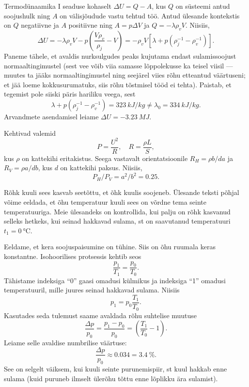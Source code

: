 \documentclass[10pt]{article}
\begin{document}
{%

\solu
Termodünaamika I seaduse kohaselt $\Delta U = Q - A$, kus $Q$ on süsteemi antud soojushulk ning $A$ on välisjõudude vastu tehtud töö. Antud ülesande kontekstis on $Q$ negatiivne ja $A$ positiivne ning $A = p\Delta V$ ja $Q = -\lambda \rho_vV$. Niisiis,
\[
\Delta U=-\lambda \rho_{v} V-p\left(\frac{V \rho_{v}}{\rho_{j}}-V\right)=-\rho_{v} V\left[\lambda+p\left(\rho_{j}^{-1}-\rho_{v}^{-1}\right)\right].
\]
Paneme tähele, et avaldis nurksulgudes peaks kujutama endast sulamissoojust normaaltingimustel (sest vee võib viia samasse lõppolekusse ka teisel viisil --- muutes ta jääks normaaltingimustel ning seejärel viies rõhu etteantud väärtuseni; et jää loeme kokkusurumatuks, siis rõhu tõstmisel tööd ei tehta). Paistab, et tegemist pole siiski päris hariliku veega, sest
\[
\lambda+p\left(\rho_{j}^{-1}-\rho_{v}^{-1}\right)= \SI{323}{kJ/kg} \neq \lambda_{0}=\SI{334}{kJ/kg}.
\]
Arvandmete asendamisel leiame $\Delta U = \SI{-3,23}{MJ}$.
\probend
\bigskip


\solu
Kehtivad valemid
\[
P=\frac{U^{2}}{R}, \quad R=\frac{\rho L}{S},
\]
kus $\rho$ on kattekihi eritakistus. Seega vastavalt orientatsioonile $R_H = \rho b/da$ ja $R_V = \rho a/db$, kus $d$ on kattekihi paksus. Niisiis,
\[
P_H/P_V = a ^2/b^2 = \num{0,25}.
\]
\probend
\bigskip


\solu
Rõhk kuuli sees kasvab seetõttu, et õhk kuulis soojeneb. Ülesande teksti põhjal võime eeldada, et õhu temperatuur kuuli sees on võrdne tema seinte temperatuuriga. Meie ülesandeks on kontrollida, kui palju on rõhk kasvanud selleks hetkeks, kui seinad hakkavad sulama, st on saavutanud temperatuuri $t_1 = \SI{0}{\degreeCelsius}$. 

Eeldame, et kera soojuspaisumine on tühine. Siis on õhu ruumala keras konstantne. Isohoorilises protsessis kehtib seos 
\[
\frac{p_1}{T_1} = \frac{p_0}{T_0}.
\]
Tähistame indeksiga \enquote{0} gaasi omadusi külmikus ja indeksiga \enquote{1} omadusi temperatuuril, mille juures seinad hakkavad sulama. Niisiis 
\[
p_1 = p_0 \frac{T_1}{T_0}.
\] 
Kasutades seda tulemust saame avaldada rõhu suhtelise muutuse 
\[
\frac{\Delta p}{p_{0}}=\frac{p_{1}-p_{0}}{p_{0}}=\left(\frac{T_{1}}{T_{0}}-1\right).
\]
Leiame selle avaldise numbrilise väärtuse: 
\[
\frac{\Delta p}{p_0} \approx \num{0,034} = \SI{3,4}{\%}.
\] 
See on selgelt väiksem, kui kuuli seinte purunemispiir, st kuul hakkab enne sulama (kuid puruneb ilmselt ülerõhu tõttu enne lõplikku ära sulamist). 

}
\end{document}
